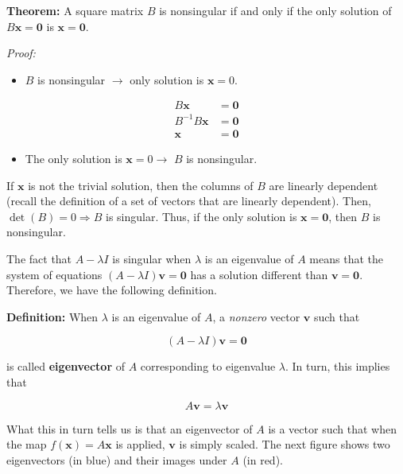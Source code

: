 \documentclass[11pt]{article}
\providecommand{\tightlist}{%
      \setlength{\itemsep}{0pt}\setlength{\parskip}{0pt}}
\begin{document}
\textbf{Theorem:} A square matrix \(B\) is nonsingular if and only if
the only solution of \(B\mathbf{x} = \mathbf{0}\) is
\(\mathbf{x} = \mathbf{0}\).

\emph{Proof:}

\begin{itemize}
\tightlist
\item
  \(B\) is nonsingular \(\rightarrow\) only solution is
  \(\mathbf{x} = 0\).
\end{itemize}

\[
  \begin{align*}
  B\mathbf{x} &= \mathbf{0} \\
  B^{-1}B\mathbf{x} &= \mathbf{0} \\
  \mathbf{x} &= \mathbf{0}
  \end{align*}
  \]

\begin{itemize}
\tightlist
\item
  The only solution is \(\mathbf{x} = 0 \rightarrow\) \(B\) is
  nonsingular.
\end{itemize}

If \(\mathbf{x}\) is not the trivial solution, then the columns of \(B\)
are linearly dependent (recall the definition of a set of vectors that
are linearly dependent). Then, \(\det(B) = 0\Rightarrow B\) is singular.
Thus, if the only solution is \(\mathbf{x} = \mathbf{0}\), then \(B\) is
nonsingular.

The fact that \(A-\lambda I\) is singular when \(\lambda\) is an
eigenvalue of \(A\) means that the system of equations
\((A-\lambda I)\mathbf{v} = \mathbf{0}\) has a solution different than
\(\mathbf{v} = \mathbf{0}\). Therefore, we have the following
definition.

\textbf{Definition:} When \(\lambda\) is an eigenvalue of \(A\), a
\emph{nonzero} vector \(\mathbf{v}\) such that

\[
(A-\lambda I)\mathbf{v} = \mathbf{0}
\]

is called \textbf{eigenvector} of \(A\) corresponding to eigenvalue
\(\lambda\). In turn, this implies that

\[
A\mathbf{v} = \lambda \mathbf{v}
\]

What this in turn tells us is that an eigenvector of \(A\) is a vector
such that when the map \(f(\mathbf{x}) = A\mathbf{x}\) is applied,
\(\mathbf{v}\) is simply scaled. The next figure shows two eigenvectors
(in blue) and their images under \(A\) (in red).

    \begin{center}
    \end{center}
    { \hspace*{\fill} \\}
    
\end{document}
